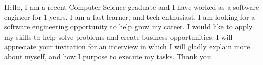 Hello, I am a recent Computer Science graduate and I have worked as a software engineer for 1 years. I am a fast learner, and tech enthusiast. I am looking for a software engineering opportunity to help grow my career. I would like to apply my skills to help solve problems and create business opportunities. I will appreciate your invitation for an interview in which I will gladly explain more about myself, and how I purpose to execute my tasks. Thank you